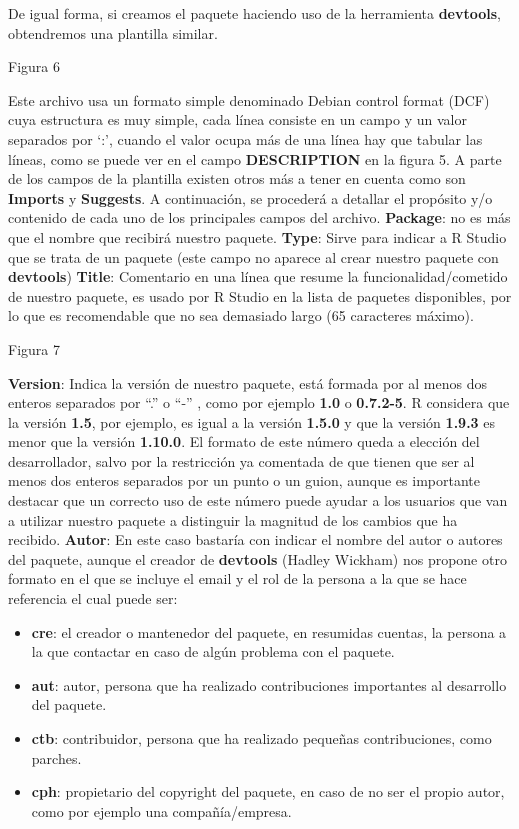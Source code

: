 De igual forma, si creamos el paquete haciendo uso de la herramienta \textbf{devtools}, obtendremos
una plantilla similar.

Figura 6

Este archivo usa un formato simple denominado Debian control format (DCF) cuya estructura
es muy simple, cada l\'inea consiste en un campo y un valor separados por \enquote*{:}, cuando el valor
ocupa m\'as de una l\'inea hay que tabular las l\'ineas, como se puede ver en el campo
\textbf{DESCRIPTION} en la figura 5.
A parte de los campos de la plantilla existen otros m\'as a tener en cuenta como son \textbf{Imports}
y \textbf{Suggests}. A continuaci\'on, se proceder\'a a detallar el prop\'osito y/o contenido de cada uno
de los principales campos del archivo.
\textbf{Package}: no es m\'as que el nombre que recibir\'a nuestro paquete.
\textbf{Type}: Sirve para indicar a R Studio que se trata de un paquete (este campo no aparece al
crear nuestro paquete con \textbf{devtools})
\textbf{Title}: Comentario en una l\'inea que resume la funcionalidad/cometido de nuestro paquete, es
usado por R Studio en la lista de paquetes disponibles, por lo que es recomendable que no
sea demasiado largo (65 caracteres m\'aximo).

Figura 7

\textbf{Version}: Indica la versi\'on de nuestro paquete, est\'a formada por al menos dos enteros
separados por “.” o “-” , como por ejemplo \textbf{1.0} o \textbf{0.7.2-5}. R considera que la versi\'on \textbf{1.5}, por
ejemplo, es igual a la versi\'on \textbf{1.5.0} y que la versi\'on \textbf{1.9.3} es menor que la versi\'on \textbf{1.10.0}.
El formato de este n\'umero queda a elecci\'on del desarrollador, salvo por la restricci\'on ya
comentada de que tienen que ser al menos dos enteros separados por un punto o un guion,
aunque es importante destacar que un correcto uso de este n\'umero puede ayudar a los
usuarios que van a utilizar nuestro paquete a distinguir la magnitud de los cambios que ha
recibido.
\textbf{Autor}: En este caso bastar\'ia con indicar el nombre del autor o autores del paquete, aunque
el creador de \textbf{devtools} (Hadley Wickham) nos propone otro formato en el que se incluye el
email y el rol de la persona a la que se hace referencia el cual puede ser:

\begin{itemize}
    \item \textbf{cre}: el creador o mantenedor del paquete, en resumidas cuentas, la persona a la que
contactar en caso de alg\'un problema con el paquete.
    \item \textbf{aut}: autor, persona que ha realizado contribuciones importantes al desarrollo del
paquete.
    \item \textbf{ctb}: contribuidor, persona que ha realizado peque\~nas contribuciones, como parches.
    \item \textbf{cph}: propietario del copyright del paquete, en caso de no ser el propio autor, como
por ejemplo una compa\~n\'ia/empresa.
\end{itemize}

